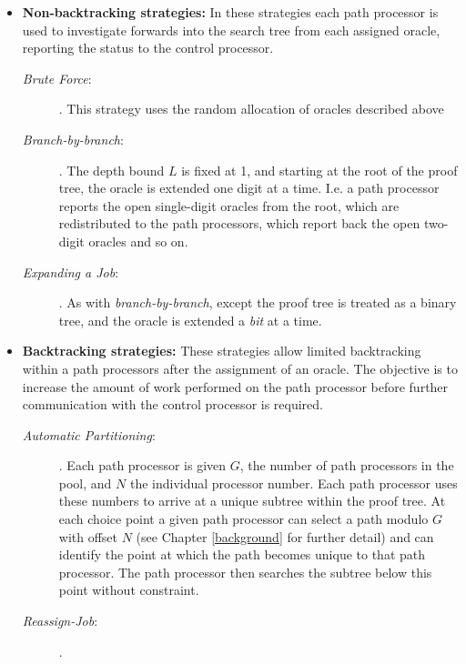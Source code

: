 \begin{itemize}
\item{\textbf{Non-backtracking strategies:}
  In these strategies each path processor is used to investigate forwards into
  the search tree from each assigned oracle, reporting the status to the control
  processor.
  \begin{description}
    \item[\textit{Brute Force}:\\]{
       \cite{CA87}.
       This strategy uses the random allocation of oracles described above}
    \item[\textit{Branch-by-branch}:\\]{
      \cite{Kle91}. 
      The depth bound $L$ is fixed at 1, and
      starting at the root of the proof tree, the oracle is extended one digit at
      a time.  I.e. a path processor reports the open single-digit oracles from
      the root, which are redistributed to the path processors, which report back the
      open two-digit oracles and so on.}
    \item[\textit{Expanding a Job}:\\]{
      \cite{CA87}.
      As with \textit{branch-by-branch}, except
      the proof tree is treated as a binary tree, and the oracle is extended a
      \textit{bit} at a time.}
  \end{description}}
\item{\textbf{Backtracking strategies:}
  These strategies allow limited backtracking within a path processors after
  the assignment of an oracle.  The objective is to increase the amount of
  work performed on the path processor before further communication with the
  control processor is required.
  \begin{description}
    \item[\textit{Automatic Partitioning}:\\]{
      \cite{Kle91}.
      Each path processor is given $G$, the number of path processors in the pool,
      and $N$ the individual processor number.  Each path processor uses these numbers to
      arrive at a unique subtree within the proof tree.  At each choice point a
      given path processor can select a path modulo $G$ with offset $N$ (see 
      Chapter \ref{background} for further detail) and can identify the point at which
      the path becomes unique to that path processor.  The path processor then
      searches the subtree below this point without constraint.}
    \item[\textit{Reassign-Job}:]{ \cite{Kle91}.
}
\end{description}}
\end{itemize}

